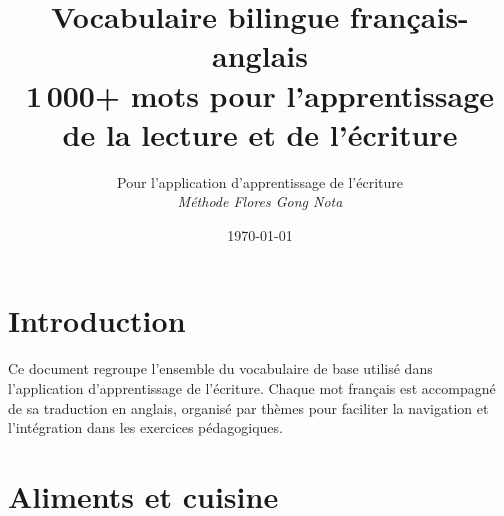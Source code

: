 \documentclass[12pt,a4paper]{article}
\title{\vspace{-2cm} \textbf{Vocabulaire bilingue français-anglais} \\
\large 1\,000+ mots pour l'apprentissage de la lecture et de l'écriture}
\author{Pour l'application d'apprentissage de l'écriture \\
\textit{Méthode Flores Gong Nota}}
\date{\today}
\begin{document}
\maketitle
\tableofcontents
\newpage

\section*{Introduction}
Ce document regroupe l'ensemble du vocabulaire de base utilisé dans l'application d'apprentissage de l'écriture. Chaque mot français est accompagné de sa traduction en anglais, organisé par thèmes pour faciliter la navigation et l'intégration dans les exercices pédagogiques.

\newpage

\section{Aliments et cuisine}
\vspace{0.5cm}
\end{document}
